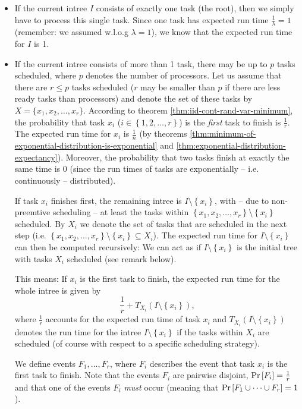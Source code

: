 \begin{itemize}
\item If the current intree $I$ consists of exactly one task (the root), then we simply have to process this single task. Since one task has expected run time $\frac{1}{\lambda}=1$ (remember: we assumed w.l.o.g $\lambda=1$), we know that the expected run time for $I$ is 1.
\item If the current intree consists of more than 1 task, there may be up to $p$ tasks scheduled, where $p$ denotes the number of processors. Let us assume that there are $r\leq p$ tasks scheduled ($r$ may be smaller than $p$ if there are less ready tasks than processors) and denote the set of these tasks by $X=\{x_1,x_2,\dots,x_r\}$. According to theorem \ref{thm:iid-cont-rand-var-minimum}, the probability that task $x_i$ ($i\in\left\{ 1,2,\dots,r \right\}$) is the \emph{first} task to finish is $\frac{1}{r}$. The expected run time for $x_i$ is $\frac{1}{n}$ (by theorems \ref{thm:minimum-of-exponential-distribution-is-exponential} and \ref{thm:exponential-distribution-expectancy}). Moreover, the probability that two tasks finish at exactly the same time is 0 (since the run times of tasks are exponentially -- i.e. continuously -- distributed).

  If task $x_i$ finishes first, the remaining intree is $I\setminus\left\{ x_i \right\}$, with -- due to non-preemtive scheduling -- at least the tasks within $\left\{ x_1,x_2,\dots,x_r \right\} \setminus \left\{ x_i \right\}$ scheduled. By $X_i$ we denote the set of tasks that are scheduled in the next step (i.e. $\left\{ x_1,x_2,\dots,x_r \right\} \setminus \left\{ x_i \right\} \subseteq X_i$). The expected run time for $I\setminus\left\{ x_i \right\}$ can then be computed recursively: We can act as if $I\setminus \left\{ x_i \right\}$ is the initial tree with tasks $X_i$ scheduled (see remark below).

  This means: If $x_i$ is the first task to finish, the expected run time for the whole intree is given by
  \begin{equation*}
    \frac{1}{r} + T_{X_i}(I\setminus\left\{ x_i \right\}),
  \end{equation*}
  where $\frac{1}{r}$ accounts for the expected run time of task $x_i$ and $T_{X_i}(I\setminus\left\{ x_i \right\})$ denotes the run time for the intree $I\setminus\left\{ x_i \right\}$ if the tasks within $X_i$ are scheduled (of course with respect to a specific scheduling strategy).

  We define events $F_1,\dots,F_r$, where $F_i$ describes the event that task $x_i$ is the first task to finish. Note that the events $F_i$ are pairwise disjoint, $\operatorname{Pr}\left[F_i\right]=\frac{1}{r}$ and that one of the events $F_i$ \emph{must} occur (meaning that $\operatorname{Pr}\left[F_1\cup \dots \cup F_r\right]=1$).
  

\end{itemize}
